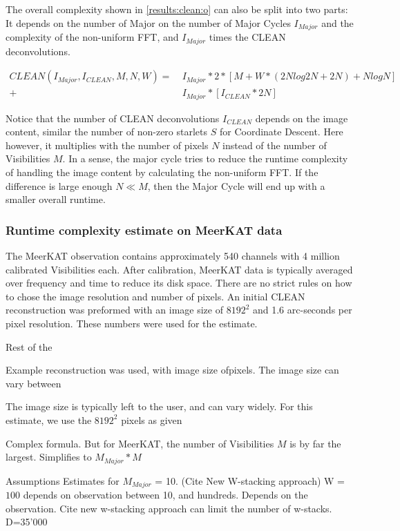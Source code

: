 The overall complexity shown in \eqref{results:clean:o} can also be split into two parts: It depends on the number of Major on the number of Major Cycles $I_{Major}$ and the complexity of the non-uniform FFT, and $I_{Major}$ times the CLEAN deconvolutions. 

\begin{equation}\label{results:clean:o}
\begin{aligned}
 CLEAN(I_{Major}, I_{CLEAN}, M, N,  W) =\: &I_{Major} * 2 * [M + W*(2N log 2N + 2N) + N log N]\\
+ &I_{Major} * [I_{CLEAN}*2N]
\end{aligned}
\end{equation}

Notice that the number of CLEAN deconvolutions $I_{CLEAN}$ depends on the image content, similar the number of non-zero starlets $S$ for Coordinate Descent. Here however, it multiplies with the number of pixels $N$ instead of the number of Visibilities $M$. In a sense, the major cycle tries to reduce the runtime complexity of handling the image content by calculating the non-uniform FFT. If the difference is large enough $N \ll M$, then the Major Cycle will end up with a smaller overall runtime.

\subsubsection{Runtime complexity estimate on MeerKAT data}
The MeerKAT observation contains approximately 540 channels with 4 million calibrated Visibilities each. After calibration, MeerKAT data is typically averaged over frequency and time to reduce its disk space. There are no strict rules on how to chose the image resolution and number of pixels. An initial CLEAN reconstruction was preformed with an image size of $8192^2$ and 1.6 arc-seconds per pixel resolution. These numbers were used for the estimate.

Rest of the 



Example reconstruction was used, with image size ofpixels. The image size can vary between 

The image size is typically left to the user, and can vary widely. For this estimate, we use the $8192^2$ pixels as given


Complex formula. But for MeerKAT, the number of Visibilities $M$ is by far the largest. Simplifies to $M_{Major}*M$

Assumptions
Estimates for $M_{Major}$ = 10. (Cite New W-stacking approach)
W = $100$ depends on observation between 10, and hundreds. Depends on the observation. Cite new w-stacking approach can limit the number of w-stacks. 
D=35'000

